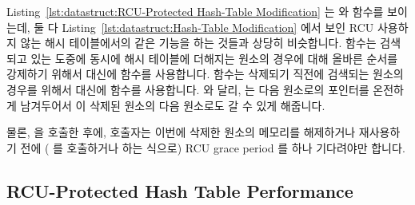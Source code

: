 Listing~\ref{lst:datastruct:RCU-Protected Hash-Table Modification} 는
 와  함수를 보이는데, 둘 다
Listing~\ref{lst:datastruct:Hash-Table Modification} 에서 보인 RCU 사용하지 않는
해시 테이블에서의 같은 기능을 하는 것들과 상당히 비슷합니다.
 함수는 검색되고 있는 도중에 동시에 해시 테이블에 더해지는
원소의 경우에 대해 올바른 순서를 강제하기 위해서  대신에
 함수를 사용합니다.
 함수는 삭제되기 직전에 검색되는 원소의 경우를 위해서
 대신에  함수를 사용합니다.
 와 달리,  는 다음 원소로의
포인터를 온전하게 남겨두어서  이 삭제된 원소의 다음
원소로도 갈 수 있게 해줍니다.

물론,  을 호출한 후에, 호출자는 이번에 삭제한 원소의 메모리를
해제하거나 재사용하기 전에 ( 를 호출하거나 하는 식으로)
RCU grace period 를 하나 기다려야만 합니다.

\subsection{RCU-Protected Hash Table Performance}
\label{sec:datastruct:RCU-Protected Hash Table Performance}


